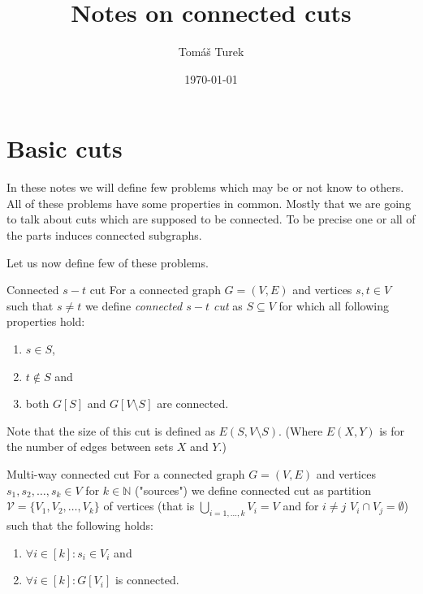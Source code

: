 \documentclass{article}
\title{Notes on connected cuts}
\author{Tomáš Turek}
\date{\today}
\begin{document}
	\maketitle
	
	
	\tableofcontents
	
	
	\section{Basic cuts}
	
	In these notes we will define few problems which may be or not know to others. All of these problems have some properties in common. Mostly that we are going to talk about cuts which are supposed to be connected. To be precise one or all of the parts induces connected subgraphs.
	
	Let us now define few of these problems.
	
	\begin{problem}{Connected $s-t$ cut}
		For a connected graph $G = (V,E)$ and vertices $s,t \in V$ such that $s\neq t$ we define \textit{connected $s-t$ cut} as $S \subseteq V$ for which all following properties hold:
		
		\begin{enumerate}
			\item $s \in S$,
			\item $t \notin S$ and
			\item both $G[S]$ and $G[V \setminus S]$ are connected.
		\end{enumerate}
	\end{problem}
	
	Note that the size of this cut is defined as $E(S, V \setminus S)$. (Where $E(X,Y)$ is for the number of edges between sets $X$ and $Y$.)
	
	\begin{problem}{Multi-way connected cut}
		For a connected graph $G = (V,E)$ and vertices $s_1, s_2, \dots, s_k \in V$ for $k \in \mathbb{N}$ ("sources") we define connected cut as partition $\mathcal{V} = \{V_1, V_2, \dots, V_k\}$ of vertices (that is $\bigcup_{i = 1, \dots, k} V_i = V$ and for $i \neq j$ $V_i \cap V_j = \emptyset$) such that the following holds:
		
		\begin{enumerate}
			\item $\forall i \in [k]: s_i \in V_i$ and
			\item $\forall i \in [k]: G[V_i]$ is connected.
		\end{enumerate}
	\end{problem}
	
\end{document}
